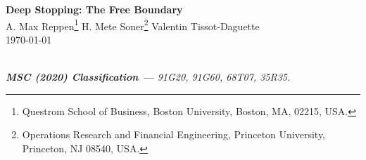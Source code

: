 \thispagestyle{firststyle}
\begin{center}
    \LARGE 
    \textbf{Deep Stopping: The Free Boundary}
    \\
    \vspace{0.5cm}
    \normalsize  A. Max Reppen\footnote[1]{Questrom School of Business, Boston University, Boston, MA, 02215, USA. } %
    \quad H. Mete Soner\footnote[2]{Operations Research and Financial Engineering, Princeton University, Princeton, NJ 08540, USA.} %
    \quad  Valentin Tissot-Daguette\footnotemark[2]\\%
\vspace{.2cm}
\today
\end{center}

\vspace{-2mm}
\begin{abstract}

\end{abstract}

\\

\textit{\textbf{MSC (2020) Classification —} 
\textnormal{91G20, %
91G60, %
68T07, %
35R35. %
}
}  

\renewcommand{\thefootnote}{\arabic{footnote}}